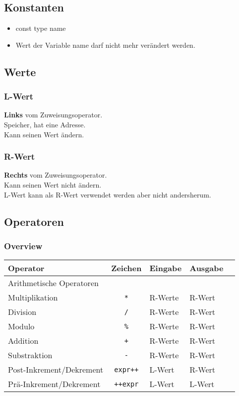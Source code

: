 \documentclass[a3paper, 10pt, landscape]{scrartcl}
\newcommand{\code}[1]{\texttt{#1}}
\begin{document}
\begin{multicols*}{3}
			
		\subsection{Konstanten}
		\begin{itemize}
			\item const type name
			\item Wert der Variable name darf nicht mehr verändert werden.
		\end{itemize}
		
	\subsection{Werte}
	
		\subsubsection{L-Wert}
		\textbf{Links} vom Zuweisungsoperator. \\
		Speicher, hat eine Adresse. \\
		Kann seinen Wert ändern.
		\subsubsection{R-Wert}
		\textbf{Rechts} vom Zuweisungsoperator. \\
		Kann seinen Wert nicht ändern. \\
		L-Wert kann als R-Wert verwendet werden aber nicht andersherum.
		
	\subsection{Operatoren}
	
	\subsubsection{Overview}
	\begin{tabular}{l c l l l}
	\textbf{Operator} & \textbf{Zeichen} & \textbf{Eingabe} & \textbf{Ausgabe}\\
	\hline
	Arithmetische Operatoren \\
	Multiplikation & \code{*} & R-Werte & R-Wert\\
	Division & \code{/} & R-Werte & R-Wert\\
	Modulo & \code{\%} & R-Werte & R-Wert\\
	Addition & \code{+} & R-Werte & R-Wert\\
	Substraktion & \code{-} & R-Werte & R-Wert\\
	Post-Inkrement/Dekrement & \code{expr++} & L-Wert & R-Wert\\
	Prä-Inkrement/Dekrement & \code{++expr} & L-Wert & L-Wert\\
	

\end{tabular}
\end{multicols*}
\end{document}
